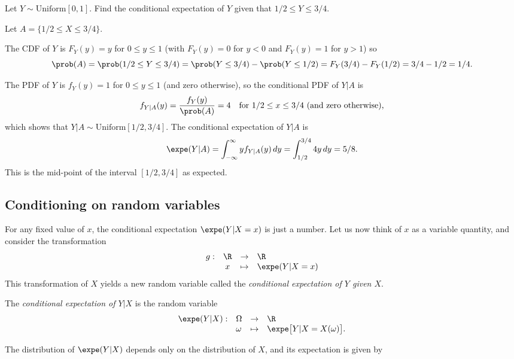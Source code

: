 \begin{example}
Let $Y\sim\text{Uniform}[0,1]$. Find the conditional expectation of $Y$ given that $1/2\leq Y\leq 3/4$.

\begin{solution}
Let $A=\{1/2\leq X\leq 3/4\}$. 

The CDF of $Y$ is $F_Y(y) = y$ for $0\leq y\leq 1$ (with $F_Y(y)=0$ for $y<0$ and $F_Y(y)=1$ for $y>1$) so
\[
\prob(A) = \prob(1/2\leq Y\leq 3/4) = \prob(Y\leq 3/4)-\prob(Y\leq 1/2) = F_Y(3/4) - F_Y(1/2) = 3/4 - 1/2 = 1/4.
\]

The PDF of $Y$ is $f_Y(y)=1$ for $0\leq y\leq 1$ (and zero otherwise), so the conditional PDF of $Y|A$ is
\[
f_{Y|A}(y) = \frac{f_Y(y)}{\prob(A)} = 4 \quad\text{for $1/2\leq x\leq 3/4$ (and zero otherwise),}
\]
which shows that $Y|A\sim\text{Uniform}[1/2,3/4]$. The conditional expectation of $Y|A$ is
\[
\expe(Y|A) 
	= \int_{-\infty}^{\infty} y f_{Y|A}(y)\,dy
	= \int_{1/2}^{3/4} 4y \,dy
	= 5/8.
\]
This is the mid-point of the interval $[1/2,3/4]$ as expected.
\end{solution}
\end{example}

\subsection{Conditioning on random variables}

For any fixed value of $x$, the conditional expectation $\expe(Y|X=x)$ is just a number. Let us now think of $x$ as a variable quantity, and consider the transformation
\[
\begin{array}{rccl}
	g:	& \R	& \to		& \R \\
		& x		& \mapsto	& \expe(Y|X=x)
\end{array}
\]
This transformation of $X$ yields a new random variable called the \emph{conditional expectation of $Y$ given $X$}.
\begin{definition}\label{def:cond_expe}
The \emph{conditional expectation of $Y|X$} is the random variable
\[\begin{array}{llll}
\expe(Y|X):	& \Omega 	& \to 		& \R \\
			& \omega	& \mapsto 	& \expe\big[Y|X=X(\omega)\big].
\end{array}\]
\end{definition}

The distribution of $\expe(Y|X)$ depends only on the distribution of $X$, and its expectation is given by

